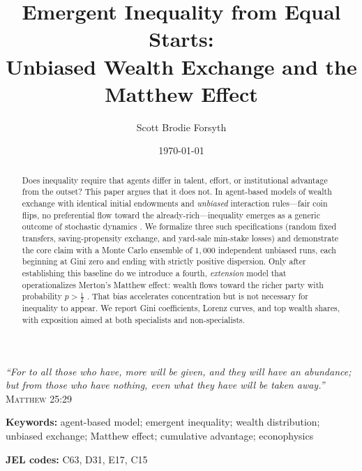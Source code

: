 \documentclass[12pt,a4paper]{article}
\title{%
  \textbf{Emergent Inequality from Equal Starts:}\\[0.4em]
  Unbiased Wealth Exchange and the Matthew Effect
}
\author{%
  Scott Brodie Forsyth
}
\date{\today}
\begin{document}
\begin{center}
  \textit{``For to all those who have, more will be given, and they will have an abundance;}\\
  \textit{but from those who have nothing, even what they have will be taken away.''}\\[0.6em]
  \textsc{Matthew} 25:29 \citep{matthew2529}
\end{center}

\vspace{1.5em}

\maketitle

\begin{abstract}
  \noindent
  Does inequality require that agents differ in talent, effort, or institutional advantage from the outset?
  This paper argues that it does not.
  In agent-based models of wealth exchange with identical initial endowments and \emph{unbiased} interaction rules---fair coin flips, no preferential flow toward the already-rich---inequality emerges as a generic outcome of stochastic dynamics \citep{dragulescu2000, yakovenko2009}.
  We formalize three such specifications (random fixed transfers, saving-propensity exchange, and yard-sale min-stake losses) and demonstrate the core claim with a Monte Carlo ensemble of $1{,}000$ independent unbiased runs, each beginning at Gini zero and ending with strictly positive dispersion.
  Only after establishing this baseline do we introduce a fourth, \emph{extension} model that operationalizes Merton's Matthew effect: wealth flows toward the richer party with probability $p > \tfrac{1}{2}$ \citep{merton1968, price1976}.
  That bias accelerates concentration but is not necessary for inequality to appear.
  We report Gini coefficients, Lorenz curves, and top wealth shares, with exposition aimed at both specialists and non-specialists.
\end{abstract}

\noindent\textbf{Keywords:} agent-based model; emergent inequality; wealth distribution; unbiased exchange; Matthew effect; cumulative advantage; econophysics

\noindent\textbf{JEL codes:} C63, D31, E17, C15

\vspace{1em}
\end{document}
